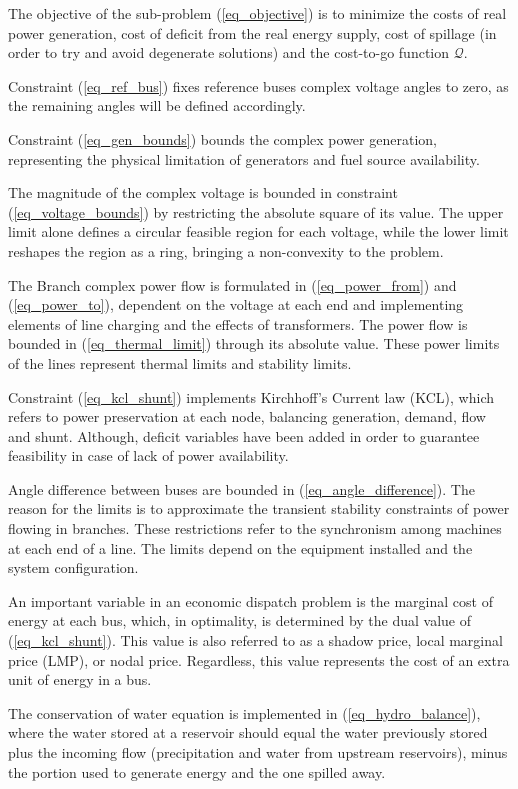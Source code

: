 \documentclass{juliacon}
\begin{document}
The objective of the sub-problem (\ref{eq_objective}) is to minimize the costs of real power generation, cost of deficit from the real energy supply, cost of spillage (in order to try and avoid degenerate solutions) and the cost-to-go function $\mathcal{Q}$.

Constraint (\ref{eq_ref_bus}) fixes reference buses complex voltage angles to zero, as the remaining angles will be defined accordingly. 

Constraint (\ref{eq_gen_bounds}) bounds the complex power generation, representing the physical limitation of generators and fuel source availability.

The magnitude of the complex voltage is bounded in constraint (\ref{eq_voltage_bounds}) by restricting the absolute square of its value. The upper limit alone defines a circular feasible region for each voltage, while the lower limit reshapes the region as a ring, bringing a non-convexity to the problem.

The Branch complex power flow is formulated in (\ref{eq_power_from}) and (\ref{eq_power_to}), dependent on the voltage at each end and implementing elements of line charging and the effects of transformers. 
The power flow is bounded in (\ref{eq_thermal_limit}) through its absolute value. These power limits of the lines represent thermal limits and stability limits.

Constraint (\ref{eq_kcl_shunt}) implements Kirchhoff’s Current law (KCL), which refers to power preservation at each node, balancing generation, demand, flow and shunt. Although, deficit variables have been added in order to guarantee feasibility in case of lack of power availability.

Angle difference between buses are bounded in (\ref{eq_angle_difference}). The reason for the limits is to approximate the transient stability constraints of power flowing in branches. These restrictions refer to the synchronism among machines at each end of a line. The limits depend on the equipment installed and the system configuration.

An important variable in an economic dispatch problem is the marginal cost of energy at each bus, which, in optimality, is determined by the dual value of (\ref{eq_kcl_shunt}). This value is also referred to as a shadow price, local marginal price (LMP), or nodal price. Regardless, this value represents the cost of an extra unit of energy in a bus.  

The conservation of water equation is implemented in (\ref{eq_hydro_balance}), where the water stored at a reservoir should equal the water previously stored plus the incoming flow (precipitation and water from upstream reservoirs), minus the portion used to generate energy and the one spilled away.
\end{document}
